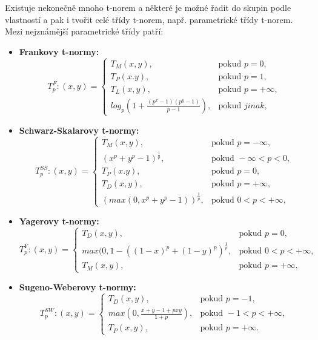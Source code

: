 Existuje nekone\v cn\v e mnoho t-norem a n\v ekter\' e je mo\v zn\' e \v radit do skupin podle vlastnost\' i a pak i tvo\v rit cel\' e t\v r\'idy t-norem, nap\v r. parametrick\' e t\v r\' idy t-norem. Mezi nejzn\' am\v ej\v s\' i parametrické třídy patří:
\begin{itemize}
    \item \textbf{Frankovy t-normy:}
    $$T_p^F:(x,y)=\begin{cases} T_M(x,y), & \mbox{pokud }  p = 0,\\ 
                                T_P(x.y), & \mbox{pokud } p = 1,\\
                                T_L(x,y), & \mbox{pokud } p = +\infty,\\
                                log_p(1+\frac{(p^x-1)(p^y-1)}{p-1}), & \mbox{pokud } jinak, 
                                \end{cases}$$
    \item \textbf{Schwarz-Skalarovy t-normy:}
    $$T_p^{SS}:(x,y)=\begin{cases} T_M(x,y), & \mbox{pokud }  p = -\infty,\\ 
                                (x^p+y^p-1)^\frac{1}{p}, & \mbox{pokud }  -\infty < p < 0,\\ 
                                T_P(x.y), & \mbox{pokud } p = 0,\\
                                T_D(x,y), & \mbox{pokud } p = +\infty,\\
                                (max(0, x^p+y^p-1))^\frac{1}{p}, & \mbox{pokud } 0 < p < +\infty, \end{cases}$$
    \item \textbf{Yagerovy t-normy:}
    $$T_p^Y:(x,y)=\begin{cases}  T_D(x,y), & \mbox{pokud } p = 0,\\
                                max(0,1-((1-x)^p+(1-y)^p)^\frac{1}{p} , & \mbox{pokud } 0 < p < +\infty,\\
                                T_M(x,y), & \mbox{pokud } p = +\infty,
                                \end{cases}$$
    \item \textbf{Sugeno-Weberovy t-normy:}
    $$T_p^{SW}:(x,y)=\begin{cases}  T_D(x,y), & \mbox{pokud } p = -1,\\
                                    max(0,\frac{x+y-1+pxy}{1+p}) , & \mbox{pokud } -1 < p < +\infty,\\
                                    T_P(x,y), & \mbox{pokud } p = +\infty.
                                    \end{cases}$$
\end{itemize}

